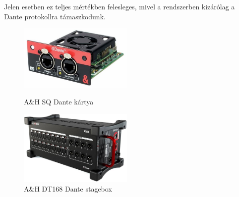 Jelen esetben ez teljes mértékben felesleges, mivel a rendszerben kizárólag a Dante protokollra támaszkodunk.
\begin{figure}[H]
    \centering
    \begin{minipage}{0.45\textwidth}
        \centering
        \includegraphics[width=55mm, keepaspectratio]{figures/sq_dante.jpg}
        \caption{A\&H SQ Dante kártya}\label{fig:sq_dante}
    \end{minipage}\hfill
    \begin{minipage}{0.45\textwidth}
        \centering
        \includegraphics[width=55mm, keepaspectratio]{figures/dt168.jpg}
        \caption{A\&H DT168 Dante stagebox}\label{fig:dt168}
    \end{minipage}
\end{figure}
